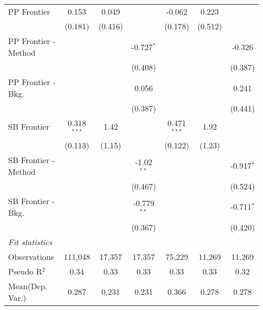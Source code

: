 \begin{tabular}{lcccccc}
   PP Frontier          & 0.153         & 0.049        &               & -0.062        & 0.223        &   \\   
                        & (0.181)       & (0.416)      &               & (0.178)       & (0.512)      &   \\   
   PP Frontier - Method &               &              & -0.727$^{*}$  &               &              & -0.326\\   
                        &               &              & (0.408)       &               &              & (0.387)\\   
   PP Frontier - Bkg.   &               &              & 0.056         &               &              & 0.241\\   
                        &               &              & (0.387)       &               &              & (0.441)\\   
   SB Frontier          & 0.318$^{***}$ & 1.42         &               & 0.471$^{***}$ & 1.92         &   \\   
                        & (0.113)       & (1.15)       &               & (0.122)       & (1.23)       &   \\   
   SB Frontier - Method &               &              & -1.02$^{**}$  &               &              & -0.917$^{*}$\\   
                        &               &              & (0.467)       &               &              & (0.524)\\   
   SB Frontier - Bkg.   &               &              & -0.779$^{**}$ &               &              & -0.711$^{*}$\\   
                        &               &              & (0.367)       &               &              & (0.420)\\   
   \midrule
   \emph{Fit statistics}\\
   Observations         & 111,048       & 17,357       & 17,357        & 75,229        & 11,269       & 11,269\\  
   Pseudo R$^2$         & 0.34          & 0.33         & 0.33          & 0.33          & 0.33         & 0.32\\  
Mean(Dep. Var.) & 0.287 & 0.231 & 0.231 & 0.366 & 0.278 & 0.278 \\
   

\end{tabular}
